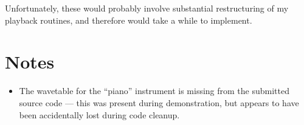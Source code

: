 Unfortunately, these would probably involve substantial restructuring of my playback routines, and 
therefore would take a while to implement.

\section{Notes}

\begin{itemize}
\item The wavetable for the ``piano'' instrument is missing from the submitted source code --- this 
was present during demonstration, but appears to have been accidentally lost during code cleanup.
\end{itemize}
